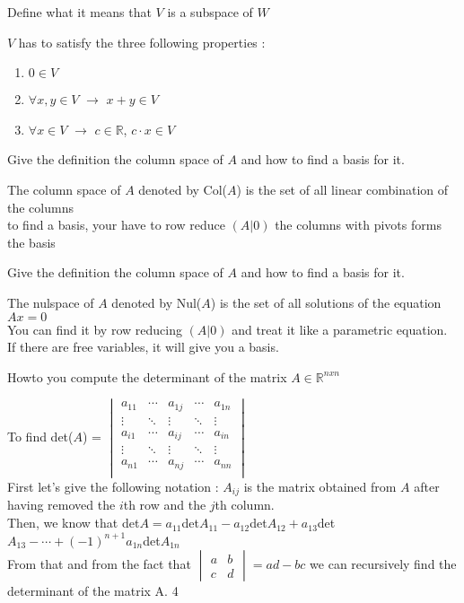 \documentclass[12pt]{article}
\newcommand*{\xfield}[1]{\begin{mdframed}\centering #1\end{mdframed}\bigskip}
\newenvironment{note}{}{}
\begin{document}
\begin{note}
\xfield{Define what it means that $V$ is a subspace of $W$}
\xfield{$V$ has to satisfy the three following properties :\\
\begin{enumerate}
\item $0 \in V$
\item $\forall x,y \in V$ $\rightarrow$ $x + y \in V$
\item $\forall x \in V$ $\rightarrow$ $c \in \mathbb{R}$, $c \cdot x \in V$
\end{enumerate} }
\end{note}

\begin{note}
\xfield{Give the definition the column space of $A$ and how to find a basis for it.}
\xfield{The column space of $A$ denoted by Col($A$) is the set of all linear combination of the columns\\
to find a basis, your have to row reduce $(A|0)$ the columns with pivots forms the basis}
\end{note}

\begin{note}
\xfield{Give the definition the column space of $A$ and how to find a basis for it.}
\xfield{The nulspace of $A$ denoted by Nul($A$) is the set of all solutions of the equation $Ax=0$\\
You can find it by row reducing $(A|0)$ and treat it like a parametric equation. If there are free variables, it will give you a basis.}
\end{note}

\begin{note}
\xfield{Howto you compute the determinant of the matrix $A \in \mathbb{R}^{nxn}$}
\xfield{To find det($A$) = $\begin{vmatrix}
 	  a_{11}&\cdots&a_{1j}&\cdots&a_{1n}\\
      \vdots&\ddots&\vdots&\ddots&\vdots\\
      a_{i1}&\cdots&a_{ij}&\cdots&a_{in}\\
      \vdots&\ddots&\vdots&\ddots&\vdots\\
      a_{n1}&\cdots&a_{nj}&\cdots&a_{nn}\\
\end{vmatrix}$ \\First let's give the following notation : $A_{ij}$ is the matrix obtained from $A$ after having removed the $i$th row and the $j$th column.\\
Then, we know that det$A = a_{11}$det$A_{11} - a_{12}$det$A_{12} +a_{13}$det$A_{13} - \cdots + (-1)^{n+1} a_{1n}$det$A_{1n}$\\
From that and from the fact that $\begin{vmatrix}
a&b\\
c&d
\end{vmatrix} = ad-bc$ we can recursively find the determinant of the matrix A. 4}
\end{note}
\end{document}
